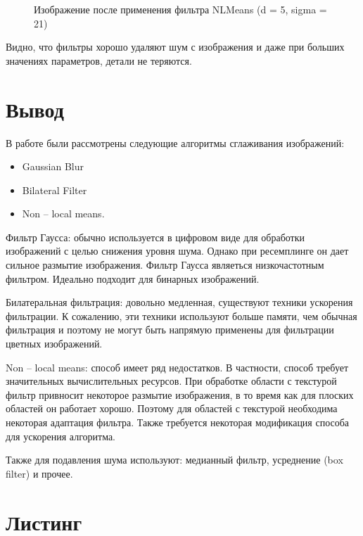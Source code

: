 \documentclass[14pt,a4paper,report]{report}
\begin{document}
\begin{figure}[h]
\begin{minipage}[h]{0.47\linewidth}
\end{minipage}
\caption{Изображение после применения фильтра NLMeans (d = 5, sigma = 21)}
\label{ris:image1}
\end{figure}

Видно, что фильтры хорошо удаляют шум с изображения и даже при больших значениях параметров, детали не теряются.


\section{Вывод}

В работе были рассмотрены следующие алгоритмы сглаживания изображений:
\begin{itemize}
\item Gaussian Blur
\item Bilateral Filter
\item Non – local means.
\end{itemize}

Фильтр Гаусса:  обычно используется в цифровом виде для обработки изображений с целью снижения уровня шума. Однако при ресемплинге он дает сильное размытие изображения. Фильтр Гаусса являеться низкочастотным фильтром. Идеально подходит для бинарных изображений.

Билатеральная фильтрация: довольно медленная, существуют техники ускорения фильтрации. К сожалению, эти техники используют больше памяти, чем обычная фильтрация и поэтому не могут быть напрямую применены для фильтрации цветных изображений.

Non – local means: способ имеет ряд недостатков. В частности, способ требует значительных вычислительных ресурсов. При обработке области с текстурой фильтр привносит некоторое размытие изображения, в то время как для плоских областей он работает хорошо. Поэтому для областей с текстурой необходима некоторая адаптация фильтра. Также требуется некоторая модификация способа для ускорения алгоритма.

Также для подавления шума используют: медианный фильтр, усреднение (box filter) и прочее.


\clearpage
\section{Листинг}

\end{document}

